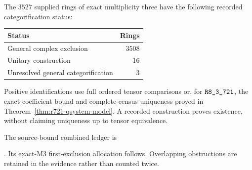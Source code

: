 \begin{theorem}\label{thm:m3-current}
The $3527$ supplied rings of exact multiplicity three have the following
recorded categorification status:
\begin{center}\begin{tabular}{@{}lr@{}}\toprule
Status & Rings\\\midrule
General complex exclusion & $3508$\\
Unitary construction & $16$\\
Unresolved general categorification & $3$\\
\bottomrule\end{tabular}\end{center}
Positive identifications use full ordered tensor comparisons or, for
$\sha{R8_3_721}$, the exact coefficient bound and complete-census uniqueness
proved in Theorem~\ref{thm:r721-qsystem-model}. A recorded construction proves
existence, without claiming uniqueness up to tensor equivalence.
\end{theorem}
The source-bound combined ledger is
\par{}.
Its exact-M3 first-exclusion
allocation follows. Overlapping obstructions are retained in the evidence
rather than counted twice.

